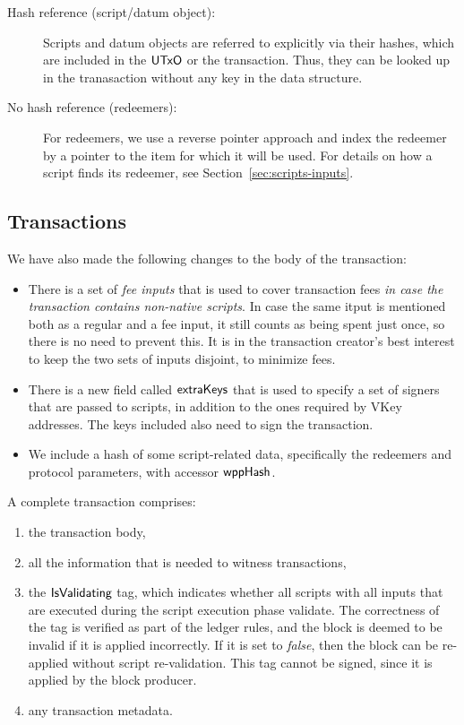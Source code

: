 \begin{description}
\item
  [Hash reference (script/datum object):]
  Scripts and datum objects are referred to explicitly via their hashes,
  which are included in the $\mathsf{UTxO}$ or the transaction. Thus, they can be
  looked up in the tranasaction without any key in the data structure.

  \item[No hash reference (redeemers):] For redeemers,
  we use a reverse pointer approach and
  index the redeemer by a pointer to the item for which it will be used.
  For details on how a script finds its redeemer, see Section~\ref{sec:scripts-inputs}.
\end{description}

\subsection{Transactions}
We have also made the following changes to
the body of the transaction:

\begin{itemize}
  \item There is a set of \emph{fee inputs} that is used to cover transaction fees
    \emph{in case the transaction contains non-native scripts}. In case the same itput is mentioned both as
    a regular and a fee input, it still counts as being spent just once, so there is no need to prevent this.
    It is in the transaction creator's best interest to keep the two sets of inputs disjoint, to minimize fees.
  \item There is a new field called $\mathsf{extraKeys}$ that is used to specify a set of signers that are passed
    to scripts, in addition to the ones required by VKey addresses. The keys included also need to sign the transaction.
  \item We include a hash of some script-related data, specifically the redeemers and protocol parameters,
    with accessor $\mathsf{wppHash}$.
\end{itemize}

A complete transaction comprises:

\begin{enumerate}
  \item the transaction body,
  \item all the information that is needed to witness transactions,
  \item the $\mathsf{IsValidating}$ tag, which indicates whether all scripts with all inputs
  that are executed during the script execution phase validate.
  The correctness of the tag is verified as part of the ledger rules, and the block is
  deemed to be invalid if it is applied incorrectly.
  If it is set to \emph{false}, then the block can be re-applied without script re-validation.
  This tag cannot be signed, since it is applied by the block producer.
  \item any transaction metadata.
\end{enumerate}

